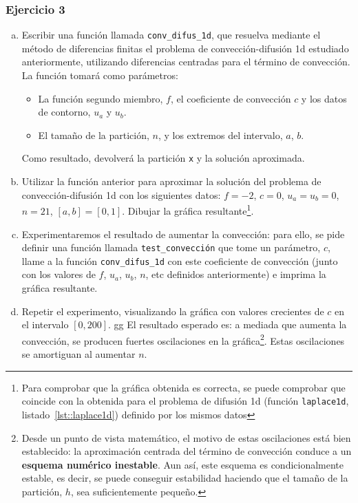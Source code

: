\documentclass[11pt,spanish,a4wide]{article}
\begin{document}
\subsubsection{Ejercicio 3}
\begin{enumerate}[a)]
\item Escribir una función llamada \texttt{conv\_difus\_1d}, que
  resuelva mediante el método de diferencias finitas el problema de
  convección-difusión 1d estudiado anteriormente, utilizando
  diferencias centradas para el término de convección. La función tomará
  como parámetros:
  \begin{itemize}
  \item La función segundo miembro, $f$, el coeficiente de convección
    $c$ y los datos de contorno, $u_a$ y $u_b$.
  \item El tamaño de la partición, $n$, y los extremos del intervalo,
    $a$, $b$.
  \end{itemize}
  Como resultado, devolverá la partición \texttt{x} y la solución
  aproximada.
\item Utilizar la función anterior para aproximar la solución del
  problema de convección-difusión 1d con los siguientes datos: $f=-2$,
  $c=0$, $u_a=u_b=0$, $n=21$, $[a,b]=[0,1]$. Dibujar la gráfica
  resultante\footnote{Para comprobar que la gráfica obtenida es
    correcta, se puede comprobar que coincide con la obtenida para el
    problema de difusión 1d (función \texttt{laplace1d},
    listado~\ref{lst::laplace1d}) definido por los mismos datos}.
\item Experimentaremos el resultado de aumentar la convección: para
  ello, se pide definir una función llamada \texttt{test\_convección}
  que tome un parámetro, $c$, llame a la función
  \texttt{conv\_difus\_1d} con este coeficiente de convección (junto
  con los valores de $f$, $u_a$, $u_b$, $n$, etc definidos
  anteriormente) e imprima la gráfica resultante.
\item Repetir el experimento, visualizando la gráfica con valores
  crecientes de $c$ en el intervalo $[0,200]$.
gg
  El resultado esperado es: a mediada que aumenta la convección, se
  producen fuertes oscilaciones en la gráfica\footnote{Desde un punto
    de vista matemático, el motivo de estas oscilaciones está bien
    establecido: la aproximación centrada del término de convección
    conduce a un \textbf{esquema numérico inestable}. Aun así, este esquema es
    condicionalmente estable, es decir, se puede conseguir estabilidad
    haciendo que el tamaño de la partición, $h$, sea suficientemente
    pequeño.}.
  Estas oscilaciones se amortiguan al aumentar $n$.


\end{enumerate}
\end{document}
